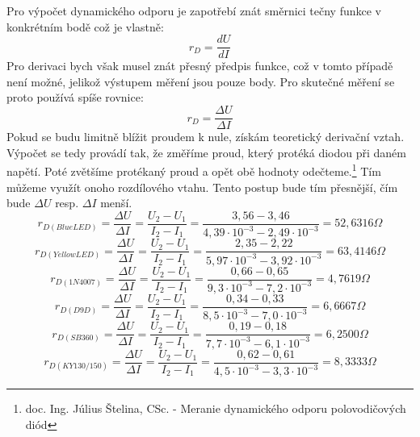\documentclass[12pt]{article} %
\begin{document}
Pro výpočet dynamického odporu je zapotřebí znát směrnici tečny funkce v konkrétním bodě což je vlastně:
\begin{equation}
r_D=\frac{dU}{dI}
\end{equation}
Pro derivaci bych však musel znát přesný předpis funkce, což v tomto případě není možné, jelikož výstupem měření jsou pouze body. Pro skutečné měření se proto používá spíše rovnice:
\begin{equation}
r_D=\frac{\Delta U}{\Delta I}
\end{equation}
Pokud se budu limitně blížit proudem k nule, získám teoretický derivační vztah. Výpočet se tedy provádí tak, že změříme proud, který protéká diodou při daném napětí. Poté zvětšíme protékaný proud a opět obě hodnoty odečteme.\footnote{doc. Ing. Július Štelina, CSc. - Meranie dynamického odporu polovodičových diód}  Tím můžeme využít onoho rozdílového vtahu. Tento postup bude tím přesnější, čím bude $\Delta U$ resp. $\Delta I$ menší.
\begin{equation}
r_{D(BlueLED)}=\frac{\Delta U}{\Delta I}=\frac{U_2-U_1}{I_2-I_1}=\frac{3,56-3,46}{4,39\cdot 10^{-3}-2,49\cdot 10^{-3}}=52,6316\Omega
\end{equation}
\begin{equation}
r_{D(YellowLED)}=\frac{\Delta U}{\Delta I}=\frac{U_2-U_1}{I_2-I_1}=\frac{2,35-2,22}{5,97\cdot 10^{-3}-3,92\cdot 10^{-3}}=63,4146\Omega
\end{equation}
\begin{equation}
r_{D(1N4007)}=\frac{\Delta U}{\Delta I}=\frac{U_2-U_1}{I_2-I_1}=\frac{0,66-0,65}{9,3\cdot 10^{-3}-7,2\cdot 10^{-3}}=4,7619\Omega
\end{equation}
\begin{equation}
r_{D(D9D)}=\frac{\Delta U}{\Delta I}=\frac{U_2-U_1}{I_2-I_1}=\frac{0,34-0,33}{8,5\cdot 10^{-3}-7,0\cdot 10^{-3}}=6,6667\Omega
\end{equation}
\begin{equation}
r_{D(SB 360)}=\frac{\Delta U}{\Delta I}=\frac{U_2-U_1}{I_2-I_1}=\frac{0,19-0,18}{7,7\cdot 10^{-3}-6,1\cdot 10^{-3}}=6,2500\Omega
\end{equation}
\begin{equation}
r_{D(KY 130/150)}=\frac{\Delta U}{\Delta I}=\frac{U_2-U_1}{I_2-I_1}=\frac{0,62-0,61}{4,5\cdot 10^{-3}-3,3\cdot 10^{-3}}=8,3333\Omega
\end{equation}
\end{document}
